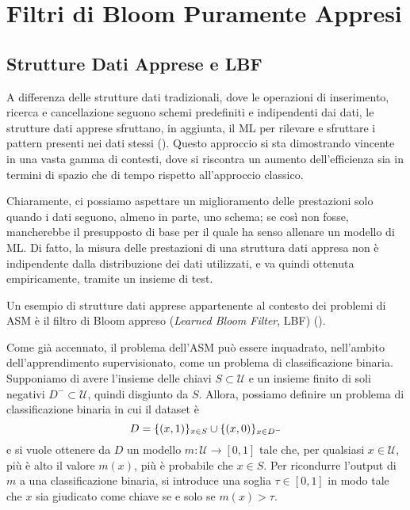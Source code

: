 \chapter{Filtri di Bloom Puramente Appresi}
\label{ch:flf}

\section{Strutture Dati Apprese e LBF}
A differenza delle strutture dati tradizionali, dove le operazioni di inserimento, ricerca e cancellazione seguono schemi predefiniti e indipendenti dai dati, le strutture dati apprese sfruttano, in aggiunta, il ML per rilevare e sfruttare i pattern presenti nei dati stessi (\cite{ferragina2020learned}).
Questo approccio si sta dimostrando vincente in una vasta gamma di contesti, dove si riscontra un aumento dell'efficienza sia in termini di spazio che di tempo rispetto all'approccio classico.

Chiaramente, ci possiamo aspettare un miglioramento delle prestazioni solo quando i dati seguono, almeno in parte, uno schema; se così non fosse, mancherebbe il presupposto di base per il quale ha senso allenare un modello di ML. Di fatto, la misura delle prestazioni di una struttura dati appresa non è indipendente dalla distribuzione dei dati utilizzati, e va quindi ottenuta empiricamente, tramite un insieme di test.

Un esempio di strutture dati apprese appartenente al contesto dei problemi di ASM è il filtro di Bloom appreso (\textit{Learned Bloom Filter}, LBF) (\cite{kraska2018learned}).

Come già accennato, il problema dell'ASM può essere inquadrato, nell'ambito dell'apprendimento supervisionato, come un problema di classificazione binaria. 
Supponiamo di avere l'insieme delle chiavi $S \subset \mathcal{U}$ e un insieme finito di soli negativi $D^- \subset \mathcal{U}$, quindi disgiunto da $S$. Allora, possiamo definire un problema di classificazione binaria in cui il dataset è
\begin{equation}
    D = \{ (x,1) \}_{x \in S} \space \cup \space \{ (x,0) \}_{x \in D^-} 
\end{equation}
e si vuole ottenere da $D$ un modello $m : \mathcal{U} \rightarrow [0, 1]$ tale che, per qualsiasi $x \in \mathcal{U}$, più è alto il valore $m(x)$, più è probabile che $x \in S$. Per ricondurre l'output di $m$ a una classificazione binaria, si introduce una soglia $\tau \in [0,1]$ in modo tale che $x$ sia giudicato come chiave se e solo se $m(x)> \tau$.

